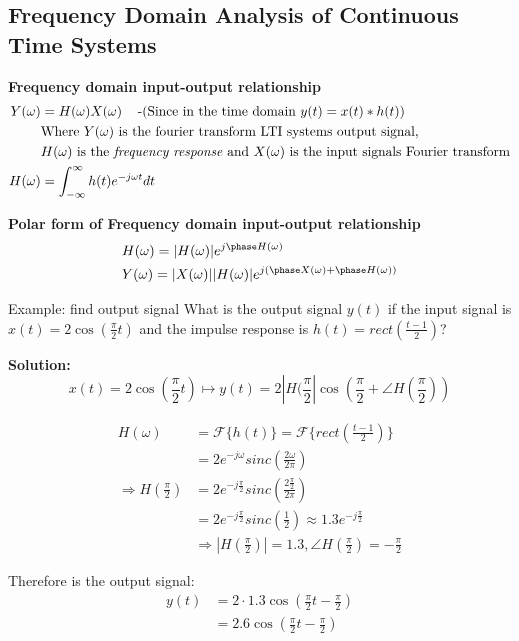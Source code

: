 \documentclass{article}
\begin{document}
\subsection{Frequency Domain Analysis of Continuous Time Systems}
\textbf{Frequency domain input-output relationship}
\begin{align*}
    Y(\omega) &= H(\omega)X(\omega) \;\;\; \text{ -(Since in the time domain $y(t)=x(t)*h(t)$)} \\
    &\text{Where $Y(\omega)$ is the fourier transform LTI systems output signal,} \\
    &\text{$H(\omega)$ is the \textit{frequency response} and $X(\omega)$ is the input signals Fourier transform} \\
    H(\omega) &= \int_{-\infty}^{\infty} h(t)e^{-j\omega t} dt
\end{align*}

\noindent\textbf{Polar form of Frequency domain input-output relationship}
\begin{align*}
    &H(\omega) = |H(\omega)|e^{j\phase H(\omega)} \\
    &Y(\omega) = |X(\omega)||H(\omega)|e^{j(\phase X(\omega) + \phase H(\omega))}
\end{align*}

\begin{exampleblock}{Example: find output signal}
    What is the output signal $y(t)$ if the input signal is $x(t)=2\cos(\frac{\pi}{2}t)$ and the
    impulse response is $h(t)=rect(\frac{t-1}{2})$?

    \textbf{Solution:}
    \begin{equation*}
        x(t)=2\cos(\frac{\pi}{2}t) \mapsto y(t)=2|H(\frac{\pi}{2}|\cos(\frac{\pi}{2}+\angle H(\frac{\pi}{2}))
    \end{equation*}

    \begin{align*}
        H(\omega) &= \mathcal{F}\{ h(t) \} = \mathcal{F}\{ rect(\frac{t-1}{2}) \} \\
        &=2e^{-j\omega}sinc(\frac{2\omega}{2\pi}) \\
        \Rightarrow H(\frac{\pi}{2}) &= 2e^{-j\frac{\pi}{2}}sinc(\frac{2\frac{\pi}{2}}{2\pi}) \\
        &= 2e^{-j\frac{\pi}{2}}sinc(\frac{1}{2}) \approx 1.3e^{-j\frac{\pi}{2}} \\
        &\Rightarrow |H(\frac{\pi}{2})|=1.3, \angle H(\frac{\pi}{2}) = -\frac{\pi}{2}
    \end{align*}

    Therefore is the output signal:
    \begin{align*}
        y(t) &= 2\cdot 1.3\cos(\frac{\pi}{2}t-\frac{\pi}{2}) \\
        &= 2.6 \cos(\frac{\pi}{2}t-\frac{\pi}{2})
    \end{align*}
\end{exampleblock}
\end{document}
